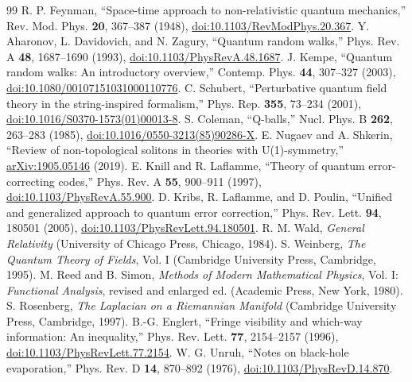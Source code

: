 \documentclass[aip,adv,reprint,onecolumn,amsmath,amssymb]{revtex4-2}
\begin{document}
\begin{thebibliography}{99}
R. P. Feynman, ``Space-time approach to non-relativistic quantum mechanics,'' Rev. Mod. Phys. \textbf{20}, 367--387 (1948), \href{https://doi.org/10.1103/RevModPhys.20.367}{doi:10.1103/RevModPhys.20.367}.
Y. Aharonov, L. Davidovich, and N. Zagury, ``Quantum random walks,'' Phys. Rev. A \textbf{48}, 1687--1690 (1993), \href{https://doi.org/10.1103/PhysRevA.48.1687}{doi:10.1103/PhysRevA.48.1687}.
J. Kempe, ``Quantum random walks: An introductory overview,'' Contemp. Phys. \textbf{44}, 307--327 (2003), \href{https://doi.org/10.1080/00107151031000110776}{doi:10.1080/00107151031000110776}.
C. Schubert, ``Perturbative quantum field theory in the string-inspired formalism,'' Phys. Rep. \textbf{355}, 73--234 (2001), \href{https://doi.org/10.1016/S0370-1573(01)00013-8}{doi:10.1016/S0370-1573(01)00013-8}.
S. Coleman, ``Q-balls,'' Nucl. Phys. B \textbf{262}, 263--283 (1985), \href{https://doi.org/10.1016/0550-3213(85)90286-X}{doi:10.1016/0550-3213(85)90286-X}.
E. Nugaev and A. Shkerin, ``Review of non-topological solitons in theories with U(1)-symmetry,'' \href{https://arxiv.org/abs/1905.05146}{arXiv:1905.05146} (2019).
E. Knill and R. Laflamme, ``Theory of quantum error-correcting codes,'' Phys. Rev. A \textbf{55}, 900--911 (1997), \href{https://doi.org/10.1103/PhysRevA.55.900}{doi:10.1103/PhysRevA.55.900}.
D. Kribs, R. Laflamme, and D. Poulin, ``Unified and generalized approach to quantum error correction,'' Phys. Rev. Lett. \textbf{94}, 180501 (2005), \href{https://doi.org/10.1103/PhysRevLett.94.180501}{doi:10.1103/PhysRevLett.94.180501}.
R. M. Wald, \emph{General Relativity} (University of Chicago Press, Chicago, 1984).
S. Weinberg, \emph{The Quantum Theory of Fields}, Vol. I (Cambridge University Press, Cambridge, 1995).
M. Reed and B. Simon, \emph{Methods of Modern Mathematical Physics}, Vol. I: \emph{Functional Analysis}, revised and enlarged ed. (Academic Press, New York, 1980).
S. Rosenberg, \emph{The Laplacian on a Riemannian Manifold} (Cambridge University Press, Cambridge, 1997).
B.-G. Englert, ``Fringe visibility and which-way information: An inequality,'' Phys. Rev. Lett. \textbf{77}, 2154--2157 (1996), \href{https://doi.org/10.1103/PhysRevLett.77.2154}{doi:10.1103/PhysRevLett.77.2154}.
W. G. Unruh, ``Notes on black-hole evaporation,'' Phys. Rev. D \textbf{14}, 870--892 (1976), \href{https://doi.org/10.1103/PhysRevD.14.870}{doi:10.1103/PhysRevD.14.870}.

\end{thebibliography}
\end{document}

